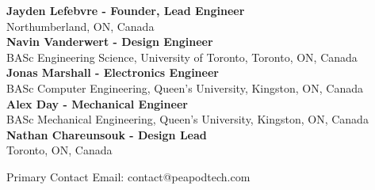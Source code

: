 \small{
    \textbf{Jayden Lefebvre - Founder, Lead Engineer}\\
    Northumberland, ON, Canada\\
    \vspace{.5cm}
    \textbf{Navin Vanderwert - Design Engineer}\\
    BASc Engineering Science, University of Toronto, Toronto, ON, Canada\\
    \vspace{.5cm}
    \textbf{Jonas Marshall - Electronics Engineer}\\
    BASc Computer Engineering, Queen's University, Kingston, ON, Canada\\
    \vspace{.5cm}
    \textbf{Alex Day - Mechanical Engineer}\\
    BASc Mechanical Engineering, Queen's University, Kingston, ON, Canada\\
    \vspace{.5cm}
    \textbf{Nathan Chareunsouk - Design Lead}\\Toronto, ON, Canada\\
}

\vspace{1cm}

Primary Contact Email: contact@peapodtech.com